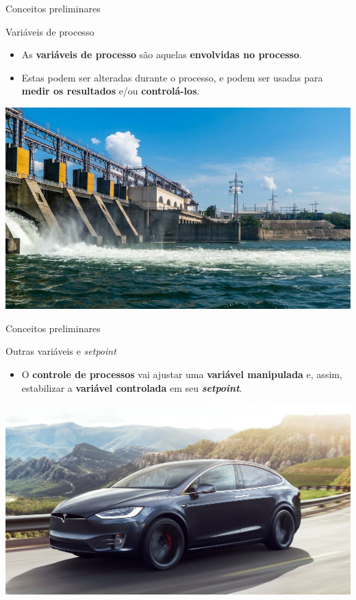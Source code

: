 \begin{frame}{Conceitos preliminares}
	\begin{block}{Variáveis de processo}
		\begin{itemize}
			\item As \textbf{variáveis de processo} são aquelas \textbf{envolvidas no processo}.
			\item Estas podem ser alteradas durante o processo, e podem ser usadas para \textbf{medir os resultados} e/ou \textbf{controlá-los}.
		\end{itemize}
	\end{block}
	
	
	\centering
	\includegraphics[width=0.8\linewidth]{Figuras/Ch11/fig5}
\end{frame}


\begin{frame}{Conceitos preliminares}
	\begin{block}{Outras variáveis e \textit{setpoint}}
		\begin{itemize}
			\item O \textbf{controle de processos} vai ajustar uma \textbf{variável manipulada} e, assim, estabilizar a \textbf{variável controlada} em seu \textbf{\textit{setpoint}}.
		\end{itemize}
	\end{block}
	
	
	\centering
	\includegraphics[width=0.8\linewidth]{Figuras/Ch11/fig6}
\end{frame}


